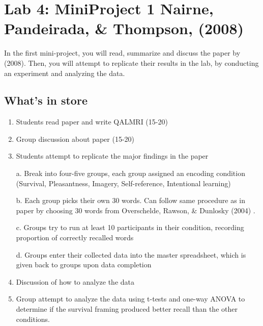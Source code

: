 
\section{Lab 4: MiniProject 1 Nairne, Pandeirada, \& Thompson, (2008)}

In the first mini-project, you will read, summarize and discuss the paper by \citeauthor{nairne_adaptive_2008} (2008)\cite{nairne_adaptive_2008}. Then, you will attempt to replicate their results in the lab, by conducting an experiment and analyzing the data.

\subsection{What's in store}
\begin{enumerate}
\item Students read paper and write QALMRI (15-20)
\item Group discussion about paper (15-20)
\item	Students attempt to replicate the major findings in the paper

a.	Break into four-five groups, each group assigned an encoding condition (Survival, Pleasantness, Imagery, Self-reference, Intentional learning)

b.	Each group picks their own 30 words. Can follow same procedure as in paper by choosing 30 words from Overschelde, Rawson, \& Dunlosky (2004) \cite{van_overschelde_category_2004}.

c.	Groups try to run at least 10 participants in their condition, recording proportion of correctly recalled words

d.	Groups enter their collected data into the master spreadsheet, which is given back to groups upon data completion

\item Discussion of how to analyze the data
\item Group attempt to analyze the data using t-tests and one-way ANOVA to determine if the survival framing produced better recall than the other conditions.
\end{enumerate}








